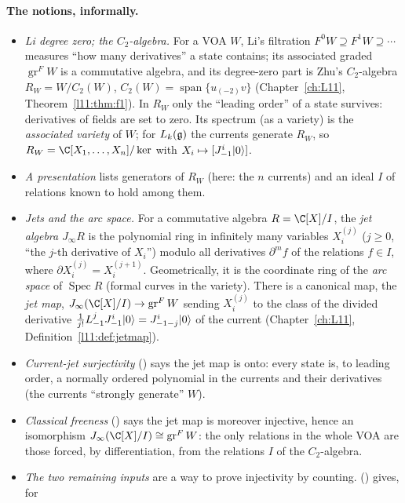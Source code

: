 \paragraph{The notions, informally.}
\begin{itemize}
\item \emph{Li degree zero; the $C_2$-algebra.} For a VOA $W$, Li's filtration $F^0W\supseteq F^1W\supseteq\cdots$ measures ``how many
  derivatives'' a state contains; its associated graded $\operatorname{gr}^FW$ is a commutative algebra, and its degree-zero part is Zhu's
  $C_2$-algebra $R_W=W/C_2(W)$, $C_2(W)=\operatorname{span}\{u_{(-2)}v\}$ (Chapter~\ref{ch:L11}, Theorem~\ref{l11:thm:f1}). In $R_W$ only the
  ``leading order'' of a state survives: derivatives of fields are set to zero. Its spectrum (as a variety) is the \emph{associated
  variety} of $W$; for $L_k(\mathfrak g)$ the currents generate $R_W$, so $R_W=\C[X_1,\dots,X_n]/\ker$ with $X_i\mapsto[J^i_{-1}|0\rangle]$.
\item \emph{A presentation} lists generators of $R_W$ (here: the $n$ currents) and an ideal $I$ of relations known to hold among them.
\item \emph{Jets and the arc space.} For a commutative algebra $R=\C[X]/I$, the \emph{jet algebra} $J_\infty R$ is the polynomial ring in
  infinitely many variables $X_i^{(j)}$ ($j\ge0$, ``the $j$-th derivative of $X_i$'') modulo all derivatives $\partial^mf$ of the relations $f\in I$,
  where $\partial X_i^{(j)}=X_i^{(j+1)}$. Geometrically, it is the coordinate ring of the \emph{arc space} of $\operatorname{Spec}R$ (formal
  curves in the variety). There is a canonical map, the \emph{jet map}, $J_\infty(\C[X]/I)\to\operatorname{gr}^FW$ sending $X_i^{(j)}$ to the
  class of the divided derivative $\frac1{j!}L_{-1}^jJ^i_{-1}|0\rangle=J^i_{-1-j}|0\rangle$ of the current (Chapter~\ref{ch:L11}, Definition~\ref{l11:def:jetmap}).
\item \emph{Current-jet surjectivity} () says the jet map is onto: every state is, to leading order, a
  normally ordered polynomial in the currents and their derivatives (the currents ``strongly generate'' $W$).
\item \emph{Classical freeness} () says the jet map is moreover injective, hence an isomorphism
  $J_\infty(\C[X]/I)\cong\operatorname{gr}^FW$: the only relations in the whole VOA are those forced, by differentiation, from the relations $I$
  of the $C_2$-algebra.
\item \emph{The two remaining inputs} are a way to prove injectivity by counting.  () gives, for

\end{itemize}
